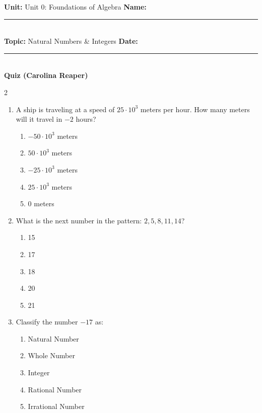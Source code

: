 \documentclass[10pt]{article}
\begin{document}
\enlargethispage{2.5cm}

\begin{tcolorbox}[colback=mainblue!5, colframe=mainblue, sharp corners, boxrule=0.5pt]
    \small \textbf{Unit:} Unit 0: Foundations of Algebra \hfill \textbf{Name:} \rule{3cm}{0.4pt} \\
    \small \textbf{Topic:} Natural Numbers & Integers \hfill \textbf{Date:} \rule{2cm}{0.4pt} \\
    \centering \textbf{\large Quiz (Carolina Reaper)}
\end{tcolorbox}

\vspace{0.2cm}

\begin{multicols}{2}
\begin{enumerate}[label=\textbf{Q\arabic*.}, leftmargin=*, itemsep=6pt, parsep=0pt]

  \item \small A ship is traveling at a speed of $25 \cdot 10^3$ meters per hour. How many meters will it travel in $-2$ hours?
  \begin{enumerate}[label=(\Alph*), leftmargin=0.6cm, nosep, itemsep=2pt]
    \item $-50 \cdot 10^3$ meters
    \item $50 \cdot 10^3$ meters
    \item $-25 \cdot 10^3$ meters
    \item $25 \cdot 10^3$ meters
    \item 0 meters
  \end{enumerate}

  \item \small What is the next number in the pattern: $2, 5, 8, 11, 14$?
  \begin{enumerate}[label=(\Alph*), leftmargin=0.6cm, nosep, itemsep=2pt]
    \item 15
    \item 17
    \item 18
    \item 20
    \item 21
  \end{enumerate}

  \item \small Classify the number $-17$ as:
  \begin{enumerate}[label=(\Alph*), leftmargin=0.6cm, nosep, itemsep=2pt]
    \item Natural Number
    \item Whole Number
    \item Integer
    \item Rational Number
    \item Irrational Number
  \end{enumerate}


\end{enumerate}
\end{multicols}
\end{document}
